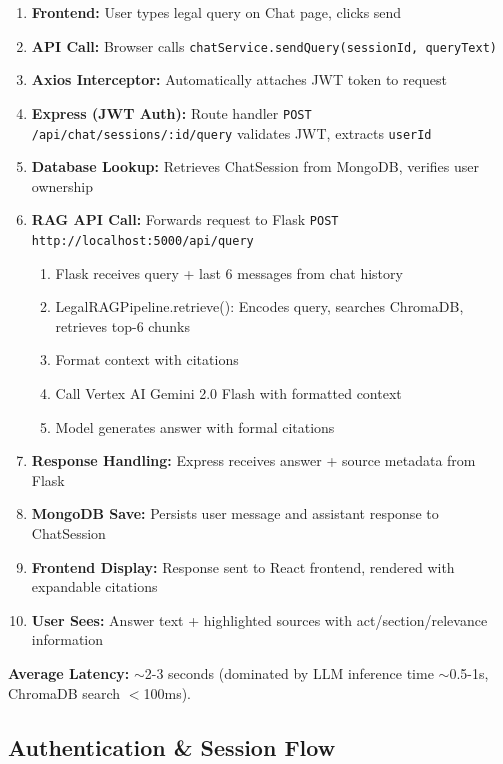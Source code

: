 \documentclass[12pt,a4paper]{article}
\begin{document}
\begin{enumerate}
    \item \textbf{Frontend:} User types legal query on Chat page, clicks send
    \item \textbf{API Call:} Browser calls \texttt{chatService.sendQuery(sessionId, queryText)}
    \item \textbf{Axios Interceptor:} Automatically attaches JWT token to request
    \item \textbf{Express (JWT Auth):} Route handler \texttt{POST /api/chat/sessions/:id/query} validates JWT, extracts \texttt{userId}
    \item \textbf{Database Lookup:} Retrieves ChatSession from MongoDB, verifies user ownership
    \item \textbf{RAG API Call:} Forwards request to Flask \texttt{POST http://localhost:5000/api/query}
    \begin{enumerate}
        \item Flask receives query + last 6 messages from chat history
        \item LegalRAGPipeline.retrieve(): Encodes query, searches ChromaDB, retrieves top-6 chunks
        \item Format context with citations
        \item Call Vertex AI Gemini 2.0 Flash with formatted context
        \item Model generates answer with formal citations
    \end{enumerate}
    \item \textbf{Response Handling:} Express receives answer + source metadata from Flask
    \item \textbf{MongoDB Save:} Persists user message and assistant response to ChatSession
    \item \textbf{Frontend Display:} Response sent to React frontend, rendered with expandable citations
    \item \textbf{User Sees:} Answer text + highlighted sources with act/section/relevance information
\end{enumerate}

\textbf{Average Latency:} $\sim$2-3 seconds (dominated by LLM inference time $\sim$0.5-1s, ChromaDB search $<$100ms).

\subsection{Authentication \& Session Flow}
\end{document}
